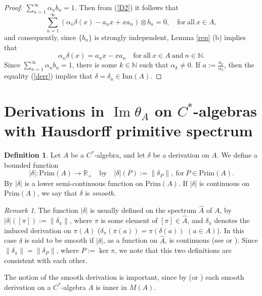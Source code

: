 \documentclass[]{amsart}
\theoremstyle{remark}
\newtheorem{remark}[theorem]{Remark}
\theoremstyle{definition}
\newtheorem{definition}[theorem]{Definition}
\theoremstyle{question}
\numberwithin{equation}{section}
\begin{document}
\begin{proof}
$\sum_{n=1}^\infty \alpha_n b_n=1$. Then from (\ref{D2}) it follows that
$$\sum_{n=1}^\infty (\alpha_n \delta(x)-a_n x + xa_n)\otimes b_n=0, \quad
\mathrm{for} \ \mathrm{all} \ x \in A,$$
and consequently, since $\{b_n\}$ is strongly independent, Lemma \ref{rep} (b)
implies that
\begin{equation}\label{derr}
\alpha_n\delta(x)= a_n x - xa_n \quad \mathrm{for} \ \mathrm{all} \ x \in A \
\mathrm{and} \ n \in {\mathbb{N}}.
\end{equation}
Since $\sum_{n=1}^\infty \alpha_n b_n=1$, there is some $k \in {\mathbb{N}}$ such that
$\alpha_k \neq 0$. If $a:=\frac{a_k}{\alpha_k}$, then the equality (\ref{derr})
implies that $\delta = \delta_a \in \mathrm{Inn}(A)$.
\end{proof}

\section{Derivations in ${\mathop{\mathrm{Im}}} \theta_A$ on $C^*$-algebras with Hausdorff primitive spectrum}

\begin{definition}\label{smooth} Let $A$ be a $C^*$-algebra, and let $\delta$ be a derivation on $A$. We define a
bounded function
$$|\delta| : \mathrm{Prim}(A) \to {\mathbb{R}}_+ \quad \mathrm{by} \quad
|\delta|(P):=\|\delta_{P}\|, \ \mathrm{for} \ P \in \mathrm{Prim}(A).$$
By \cite[2.2]{AEP} $|\delta|$ is a lower semi-continuous function on $\mathrm{Prim}(A)$.
If $|\delta|$ is continuous on $\mathrm{Prim}(A)$, we say that $\delta$ is \textit{smooth}.
\end{definition}

\begin{remark} The function $|\delta|$ is usually defined on the spectrum
$\hat{A}$ of $A$, by $|\delta|([\pi]):=\|\delta_{\pi}\|$, where
$\pi$ is some element of $[\pi]\in \hat{A}$, and $\delta_{\pi}$ denotes the
induced derivation on $\pi(A)$ ($\delta_\pi(\pi(a))=\pi(\delta(a))$ $(a \in A)$). In this case $\delta$ is said to
be smooth if $|\delta|$, as a function on $\hat{A}$, is continuous (see
\cite[2.3]{AEP} or \cite[4.2.6]{Ara}). Since $\|\delta_{\pi}\|=\|\delta_P\|$, where $P:=\ker\pi$, we note that this two definitions are
consistent with each other.
\end{remark}
The notion of the smooth derivation is important, since by \cite[2.4]{AEP} (or \cite[4.2.7]{Ara}) each smooth derivation on a $C^*$-algebra $A$ is inner in $M(A)$.
\medskip
\end{document}
